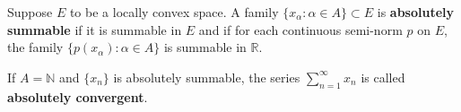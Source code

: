 Suppose $E$ to be a locally convex space. A family $\{x_\alpha : \alpha \in A\} \subset E$ is \textbf{absolutely summable} if it is summable in $E$ and if for each continuous semi-norm $p$ on $E$, the family $\{p(x_\alpha) : \alpha \in A\}$ is summable in $\mathbb{R}$.

If $A = \mathbb{N}$ and $\{x_n\}$ is absolutely summable, the series $\sum_{n=1}^{\infty} x_n$ is called \textbf{absolutely convergent}.
